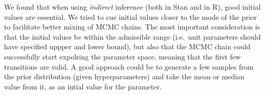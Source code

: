 \documentclass[
  12pt,
]{article}
\begin{document}
We found that when using \emph{indirect} inference (both in Stan and in R), good initial values are essential. We tried to cue initial values closer to the mode of the prior to facilitate better mixing of MCMC chains. The most important consideration is that the initial values be within the admissible range (i.e.~unit parameters should have specified uppper and lower bound), but also that the MCMC chain could successfully start expolring the parameter space, meaning that the first few transitions are valid. A good approach could be to generate a few samples from the prior distribution (given hyperparameters) and take the mean or median value from it, as an intial value for the parameter.

  
\end{document}

